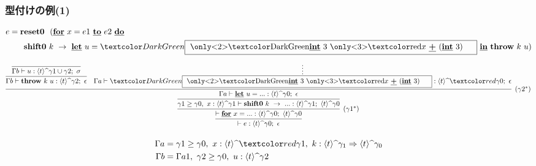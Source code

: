\newcommand\boxterm{\framebox{
    \only<2>{\green{$\cint{3}$}}
    \only<3>{\red{$x~\cPlus~(\cint{3})$}}
    \phantom{A}
  }}

\begin{frame}
  \frametitle{型付けの例(1)}
  \begin{align*}
    e & = \Resetz ~~(\cfordo{x = e1}{e2} \\
       & \phantom{=}~~~ \Shiftz~k~\to~
         {\cLet~u=\green{\boxterm}~\cIn}~\Throw~k~u)
  \end{align*}

  \[
    \infer{\vdash e : \codeTs{t}{\gamma0};~\epsilon}
    {\infer[(\gamma1^*)]{\vdash \cfor{x=...} :
        \codeTs{t}{\gamma0};~\codeTs{t}{\gamma0}}
      {\infer{\gamma1 \ord \gamma0,~x:\codeTs{t}{\gamma1}
          \vdash \Shiftz~k~\to~... :
          \codeTs{t}{\gamma1};~\codeTs{t}{\gamma0}}
        {\infer[(\gamma2^*)]{\Gamma a \vdash \cLet~u=...:\codeTs{t}{\gamma0};~\epsilon}
          {\infer{\Gamma b \vdash
              \Throw~k~u:\codeTs{t}{\gamma2};~\epsilon }
            {\infer{\Gamma b \vdash
                u:\codeTs{t}{\gamma1 \cup \gamma2};~ \sigma}
              {}
            }
            &\infer*{\Gamma a \vdash
              \green{\boxterm}:\codeTs{t}{\red{\gamma0}};~\epsilon}
            {}
          }
        }
      }
    }
  \]


  {\footnotesize
    \begin{align*}
      \Gamma a &= \gamma1 \ord \gamma0,~x:\codeTs{t}{\red{\gamma1}},
                ~k: \contT{\codeTs{t}{\gamma_1}}{\codeTs{t}{\gamma_0}} \\
      \Gamma b &= \Gamma a1,~\gamma2 \ord \gamma0,~u:\codeTs{t}{\gamma2}
    \end{align*}
  }

\end{frame}

